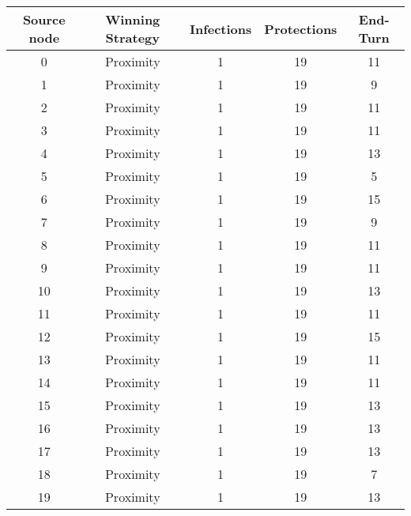 \documentclass[results.tex]{subfiles}
\begin{document}
\begin{center}
  \begin{tabular}{| c || c | c | c | c |}
    \hline
    {\bfseries Source node} & {\bfseries Winning Strategy} & {\bfseries Infections} & {\bfseries Protections} & {\bfseries End-Turn} \\  %
    \hline\hline
    0 & Proximity & 1 & 19 & 11 \\
    \hline
    1 & Proximity & 1 & 19 & 9 \\
    \hline
    2 & Proximity & 1 & 19 & 11 \\
    \hline
    3 & Proximity & 1 & 19 & 11 \\
    \hline
    4 & Proximity & 1 & 19 & 13 \\
    \hline
    5 & Proximity & 1 & 19 & 5 \\
    \hline
    6 & Proximity & 1 & 19 & 15 \\
    \hline
    7 & Proximity & 1 & 19 & 9 \\
    \hline
    8 & Proximity & 1 & 19 & 11 \\
    \hline
    9 & Proximity & 1 & 19 & 11 \\
    \hline
    10 & Proximity & 1 & 19 & 13 \\
    \hline
    11 & Proximity & 1 & 19 & 11 \\
    \hline
    12 & Proximity & 1 & 19 & 15 \\
    \hline
    13 & Proximity & 1 & 19 & 11 \\
    \hline
    14 & Proximity & 1 & 19 & 11 \\
    \hline
    15 & Proximity & 1 & 19 & 13 \\
    \hline
    16 & Proximity & 1 & 19 & 13 \\
    \hline
    17 & Proximity & 1 & 19 & 13 \\
    \hline
    18 & Proximity & 1 & 19 & 7 \\
    \hline
    19 & Proximity & 1 & 19 & 13 \\
    \hline
  \end{tabular}
\end{center}
\end{document}
